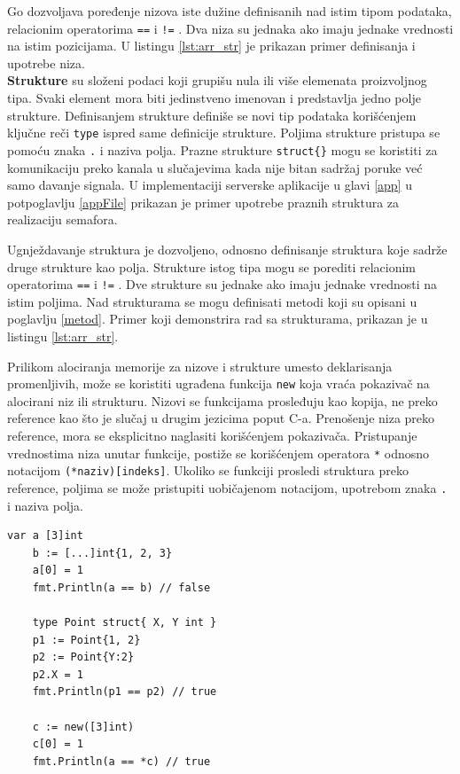 \documentclass[12pt,oneside]{memoir}
\begin{document}
Go dozvoljava poređenje nizova iste dužine definisanih nad istim tipom podataka, relacionim operatorima \texttt{==} i \texttt{!=} . Dva niza su jednaka ako imaju jednake vrednosti na istim pozicijama. U listingu \ref{lst:arr_str} je prikazan primer definisanja i upotrebe niza.
\\

\textbf{Strukture} su složeni podaci koji grupišu nula ili više elemenata proizvoljnog tipa. Svaki element mora biti jedinstveno imenovan i predstavlja jedno polje strukture. Definisanjem strukture definiše se novi tip podataka korišćenjem ključne reči \texttt{type} ispred same definicije strukture. Poljima strukture pristupa se pomoću znaka \texttt{.} i naziva polja. Prazne strukture \texttt{struct\{\}} mogu se koristiti za komunikaciju preko kanala u slučajevima kada nije bitan sadržaj poruke već samo davanje signala. U implementaciji serverske aplikacije u glavi \ref{app} u potpoglavlju \ref{appFile} prikazan je primer upotrebe praznih struktura za realizaciju semafora. 

Ugnježdavanje struktura je dozvoljeno, odnosno definisanje struktura koje sadrže druge strukture kao polja. Strukture istog tipa mogu se porediti relacionim operatorima   \texttt{==} i \texttt{!=} . Dve strukture su jednake ako imaju jednake vrednosti na istim poljima. Nad strukturama se mogu definisati metodi koji su opisani u poglavlju \ref{metod}. Primer koji demonstrira rad sa strukturama, prikazan je u listingu  \ref{lst:arr_str}.

Prilikom alociranja memorije za nizove i strukture umesto deklarisanja promenljivih, može se koristiti ugrađena funkcija \texttt{new} koja vraća pokazivač na alocirani niz ili strukturu. Nizovi se funkcijama prosleđuju kao kopija, ne preko reference kao što je slučaj u drugim jezicima poput C-a. Prenošenje niza preko reference, mora se eksplicitno naglasiti korišćenjem pokazivača. Pristupanje vrednostima niza unutar funkcije, postiže se korišćenjem operatora \texttt{*} odnosno notacijom \texttt{(*naziv)[indeks]}. Ukoliko se funkciji prosledi struktura preko reference, poljima se može pristupiti uobičajenom notacijom, upotrebom znaka \texttt{.} i naziva polja.


\begin{center}
\begin{lstlisting}[caption=Primer koji demonstrira rad sa nizovima i strukturama, label={lst:arr_str},  backgroundcolor=\color{background}]
	var a [3]int
	b := [...]int{1, 2, 3}
	a[0] = 1
	fmt.Println(a == b) // false

	type Point struct{ X, Y int }
	p1 := Point{1, 2}
	p2 := Point{Y:2}
	p2.X = 1
	fmt.Println(p1 == p2) // true

	c := new([3]int)
	c[0] = 1
	fmt.Println(a == *c) // true			
\end{lstlisting}
\end{center}
\end{document}
